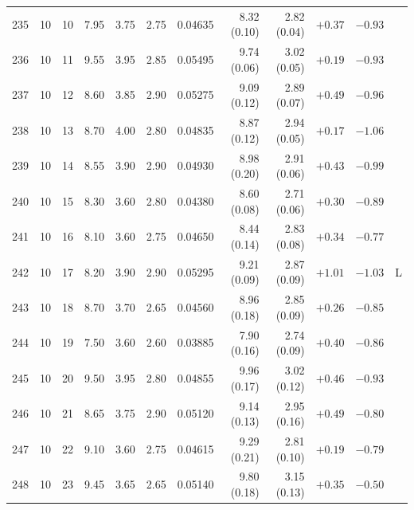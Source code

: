 \begin{longtable}{@{}rrrrrrrrrrrr@{}}
235 & 10 & 10 & \num{7.95} & \num{3.75} & \num{2.75} & \num{0.04635} & \num{8.32} (\num{0.10}) & \num{2.82} (\num{0.04}) & $+\num{0.37}$ & $-\num{0.93}$ &  \\
236 & 10 & 11 & \num{9.55} & \num{3.95} & \num{2.85} & \num{0.05495} & \num{9.74} (\num{0.06}) & \num{3.02} (\num{0.05}) & $+\num{0.19}$ & $-\num{0.93}$ &  \\
237 & 10 & 12 & \num{8.60} & \num{3.85} & \num{2.90} & \num{0.05275} & \num{9.09} (\num{0.12}) & \num{2.89} (\num{0.07}) & $+\num{0.49}$ & $-\num{0.96}$ &  \\
238 & 10 & 13 & \num{8.70} & \num{4.00} & \num{2.80} & \num{0.04835} & \num{8.87} (\num{0.12}) & \num{2.94} (\num{0.05}) & $+\num{0.17}$ & $-\num{1.06}$ &  \\
239 & 10 & 14 & \num{8.55} & \num{3.90} & \num{2.90} & \num{0.04930} & \num{8.98} (\num{0.20}) & \num{2.91} (\num{0.06}) & $+\num{0.43}$ & $-\num{0.99}$ &  \\
240 & 10 & 15 & \num{8.30} & \num{3.60} & \num{2.80} & \num{0.04380} & \num{8.60} (\num{0.08}) & \num{2.71} (\num{0.06}) & $+\num{0.30}$ & $-\num{0.89}$ &  \\
241 & 10 & 16 & \num{8.10} & \num{3.60} & \num{2.75} & \num{0.04650} & \num{8.44} (\num{0.14}) & \num{2.83} (\num{0.08}) & $+\num{0.34}$ & $-\num{0.77}$ &  \\
242 & 10 & 17 & \num{8.20} & \num{3.90} & \num{2.90} & \num{0.05295} & \num{9.21} (\num{0.09}) & \num{2.87} (\num{0.09}) & $+\num{1.01}$ & $-\num{1.03}$ & L \\
243 & 10 & 18 & \num{8.70} & \num{3.70} & \num{2.65} & \num{0.04560} & \num{8.96} (\num{0.18}) & \num{2.85} (\num{0.09}) & $+\num{0.26}$ & $-\num{0.85}$ &  \\
244 & 10 & 19 & \num{7.50} & \num{3.60} & \num{2.60} & \num{0.03885} & \num{7.90} (\num{0.16}) & \num{2.74} (\num{0.09}) & $+\num{0.40}$ & $-\num{0.86}$ &  \\
245 & 10 & 20 & \num{9.50} & \num{3.95} & \num{2.80} & \num{0.04855} & \num{9.96} (\num{0.17}) & \num{3.02} (\num{0.12}) & $+\num{0.46}$ & $-\num{0.93}$ &  \\
246 & 10 & 21 & \num{8.65} & \num{3.75} & \num{2.90} & \num{0.05120} & \num{9.14} (\num{0.13}) & \num{2.95} (\num{0.16}) & $+\num{0.49}$ & $-\num{0.80}$ &  \\
247 & 10 & 22 & \num{9.10} & \num{3.60} & \num{2.75} & \num{0.04615} & \num{9.29} (\num{0.21}) & \num{2.81} (\num{0.10}) & $+\num{0.19}$ & $-\num{0.79}$ &  \\
248 & 10 & 23 & \num{9.45} & \num{3.65} & \num{2.65} & \num{0.05140} & \num{9.80} (\num{0.18}) & \num{3.15} (\num{0.13}) & $+\num{0.35}$ & $-\num{0.50}$ &  \\

\end{longtable}
